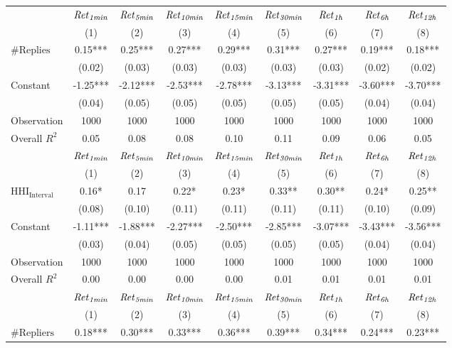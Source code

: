 \begin{tabular}{lcccccccc}
\hline
 & ${\it Ret}_{\it 1min}$ & ${\it Ret}_{\it 5min}$ & ${\it Ret}_{\it 10min}$ & ${\it Ret}_{\it 15min}$ & ${\it Ret}_{\it 30min}$ & ${\it Ret}_{\it 1h}$ & ${\it Ret}_{\it 6h}$ & ${\it Ret}_{\it 12h}$ \\
 & (1) & (2) & (3) & (4) & (5) & (6) & (7) & (8) \\
\hline
$\#\text{Replies}$ & 0.15*** & 0.25*** & 0.27*** & 0.29*** & 0.31*** & 0.27*** & 0.19*** & 0.18*** \\
 & (0.02) & (0.03) & (0.03) & (0.03) & (0.03) & (0.03) & (0.02) & (0.02) \\
Constant & -1.25*** & -2.12*** & -2.53*** & -2.78*** & -3.13*** & -3.31*** & -3.60*** & -3.70*** \\
 & (0.04) & (0.05) & (0.05) & (0.05) & (0.05) & (0.05) & (0.04) & (0.04) \\
Observation & 1000 & 1000 & 1000 & 1000 & 1000 & 1000 & 1000 & 1000 \\
Overall $R^2$ & 0.05 & 0.08 & 0.08 & 0.10 & 0.11 & 0.09 & 0.06 & 0.05 \\
\hline
 & ${\it Ret}_{\it 1min}$ & ${\it Ret}_{\it 5min}$ & ${\it Ret}_{\it 10min}$ & ${\it Ret}_{\it 15min}$ & ${\it Ret}_{\it 30min}$ & ${\it Ret}_{\it 1h}$ & ${\it Ret}_{\it 6h}$ & ${\it Ret}_{\it 12h}$ \\
 & (1) & (2) & (3) & (4) & (5) & (6) & (7) & (8) \\
\hline
$\text{HHI}_{\text{Interval}}$ & 0.16* & 0.17 & 0.22* & 0.23* & 0.33** & 0.30** & 0.24* & 0.25** \\
 & (0.08) & (0.10) & (0.11) & (0.11) & (0.11) & (0.11) & (0.10) & (0.09) \\
Constant & -1.11*** & -1.88*** & -2.27*** & -2.50*** & -2.85*** & -3.07*** & -3.43*** & -3.56*** \\
 & (0.03) & (0.04) & (0.05) & (0.05) & (0.05) & (0.05) & (0.04) & (0.04) \\
Observation & 1000 & 1000 & 1000 & 1000 & 1000 & 1000 & 1000 & 1000 \\
Overall $R^2$ & 0.00 & 0.00 & 0.00 & 0.00 & 0.01 & 0.01 & 0.01 & 0.01 \\
\hline
 & ${\it Ret}_{\it 1min}$ & ${\it Ret}_{\it 5min}$ & ${\it Ret}_{\it 10min}$ & ${\it Ret}_{\it 15min}$ & ${\it Ret}_{\it 30min}$ & ${\it Ret}_{\it 1h}$ & ${\it Ret}_{\it 6h}$ & ${\it Ret}_{\it 12h}$ \\
 & (1) & (2) & (3) & (4) & (5) & (6) & (7) & (8) \\
\hline
$\#\text{Repliers}$ & 0.18*** & 0.30*** & 0.33*** & 0.36*** & 0.39*** & 0.34*** & 0.24*** & 0.23*** \\

\end{tabular}
